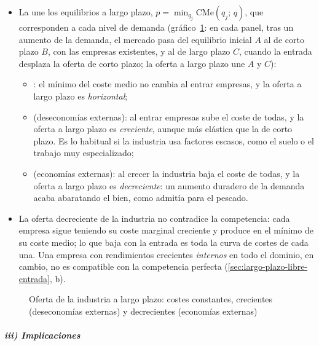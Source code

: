 \documentclass[11pt]{article}
\begin{document}
\begin{itemize}
\item La  une los equilibrios a largo plazo, $p=\min_{q_j}\mathrm{CMe}(q_j;\,q)$, que corresponden a cada nivel de demanda (gráfico~\ref{fig:oferta-largo-plazo}: en cada panel, tras un aumento de la demanda, el mercado pasa del equilibrio inicial $A$ al de corto plazo $B$, con las empresas existentes, y al de largo plazo $C$, cuando la entrada desplaza la oferta de corto plazo; la oferta a largo plazo une $A$ y $C$):
  \begin{itemize}
  \item {}: el mínimo del coste medio no cambia al entrar empresas, y la oferta a largo plazo es \emph{horizontal};
  \item {} (deseconomías externas): al entrar empresas sube el coste de todas, y la oferta a largo plazo es \emph{creciente}, aunque más elástica que la de corto plazo. Es lo habitual si la industria usa factores escasos, como el suelo o el trabajo muy especializado;
  \item {} (economías externas): al crecer la industria baja el coste de todas, y la oferta a largo plazo es \emph{decreciente}: un aumento duradero de la demanda acaba abaratando el bien, como admitía  para el pescado.
  \end{itemize}
\item La oferta decreciente de la industria no contradice la competencia: cada empresa sigue teniendo su coste marginal creciente y produce en el mínimo de su coste medio; lo que baja con la entrada es toda la curva de costes de cada una. Una empresa con rendimientos crecientes \emph{internos} en todo el dominio, en cambio, no es compatible con la competencia perfecta (\ref{sec:largo-plazo-libre-entrada}, b).
\end{itemize}

\begin{figure}[H]
\centering
\caption{Oferta de la industria a largo plazo: costes constantes, crecientes (deseconomías externas) y decrecientes (economías externas)}\label{fig:oferta-largo-plazo}
\end{figure}

\subparagraph{iii) Implicaciones}
\end{document}
